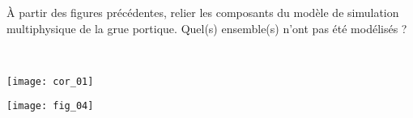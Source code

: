 \fi

\begin{question}
À partir des figures précédentes, relier les composants du modèle de simulation
multiphysique de la grue portique. Quel(s) ensemble(s) n’ont pas été modélisés ?
\end{question}

\ifprof
\begin{corrige}~\\

\begin{center}
\texttt{[image: cor\_01]}
\end{center}
\end{corrige}
\else
\fi


\ifprof
\else
\begin{center}
\texttt{[image: fig\_04]}
\end{center}
\fi
